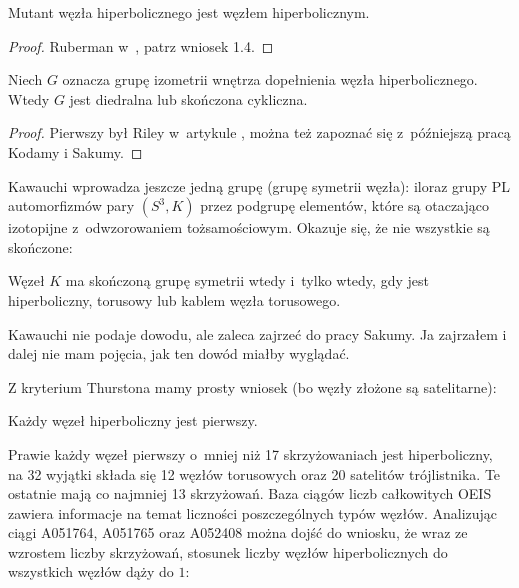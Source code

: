 \begin{proposition}
    Mutant węzła hiperbolicznego jest węzłem hiperbolicznym.
\end{proposition}

\begin{proof}
    Ruberman w~\cite{ruberman87}, patrz wniosek 1.4.
\end{proof}

\begin{proposition}
    Niech $G$ oznacza grupę izometrii wnętrza dopełnienia węzła hiperbolicznego.
    Wtedy $G$ jest diedralna lub skończona cykliczna.
\end{proposition}

\begin{proof}
    Pierwszy był Riley w~artykule \cite[s. 124]{riley79}, można też zapoznać się z~późniejszą pracą \cite{kodama92} Kodamy i Sakumy.
\end{proof}

Kawauchi \cite[s. 131]{kawauchi96} wprowadza jeszcze jedną grupę (grupę symetrii węzła): iloraz grupy PL automorfizmów pary $(S^3, K)$ przez podgrupę elementów, które są otaczająco izotopijne z~odwzorowaniem tożsamościowym.
Okazuje się, że nie wszystkie są skończone:

\begin{proposition}
    Węzeł $K$ ma skończoną grupę symetrii wtedy i~tylko wtedy, gdy jest hiperboliczny, torusowy lub kablem węzła torusowego.
\end{proposition}

Kawauchi nie podaje dowodu, ale zaleca zajrzeć do pracy Sakumy.
Ja zajrzałem i dalej nie mam pojęcia, jak ten dowód miałby wyglądać.

Z kryterium Thurstona mamy prosty wniosek (bo węzły złożone są satelitarne):

\begin{corollary}
    Każdy węzeł hiperboliczny jest pierwszy.
\end{corollary}

Prawie każdy węzeł pierwszy o~mniej niż 17 skrzyżowaniach jest hiperboliczny, na 32 wyjątki składa się 12 węzłów torusowych oraz 20 satelitów trójlistnika.
Te ostatnie mają co najmniej 13 skrzyżowań.
Baza ciągów liczb całkowitych OEIS zawiera informacje na temat liczności poszczególnych typów węzłów.
Analizując ciągi A051764, A051765 oraz A052408 można dojść do wniosku, że wraz ze wzrostem liczby skrzyżowań, stosunek liczby węzłów hiperbolicznych do wszystkich węzłów dąży do $1$:

